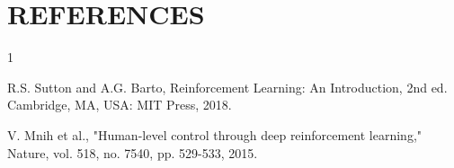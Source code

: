 \documentclass[letterpaper, 10 pt, conference]{ieeeconf}
\begin{document}
\section{REFERENCES}
\begin{thebibliography}{1}

R.S. Sutton and A.G. Barto, Reinforcement Learning: An Introduction, 2nd ed. Cambridge, MA, USA: MIT Press, 2018.

V. Mnih et al., "Human-level control through deep reinforcement learning," Nature, vol. 518, no. 7540, pp. 529-533, 2015.

\end{thebibliography}
\end{document}
